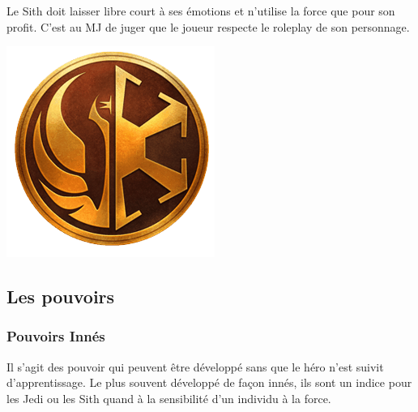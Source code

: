 Le Sith doit laisser libre court à ses émotions et n'utilise la force que pour son profit. C'est au MJ de juger que le joueur respecte le roleplay de son personnage.

\begin{center}
	\vspace*{\fill}
	\includegraphics[width=\linewidth]{img/pouvoirs/jedi-sith.png}
	\vspace*{\fill}
\end{center}

\clearpage
\subsection{Les pouvoirs}

\subsubsection{Pouvoirs Innés}
Il s'agit des pouvoir qui peuvent être développé sans que le héro n'est suivit d'apprentissage. Le plus souvent développé de façon innés, ils sont un indice pour les Jedi ou les Sith quand à la sensibilité d'un individu à la force.

